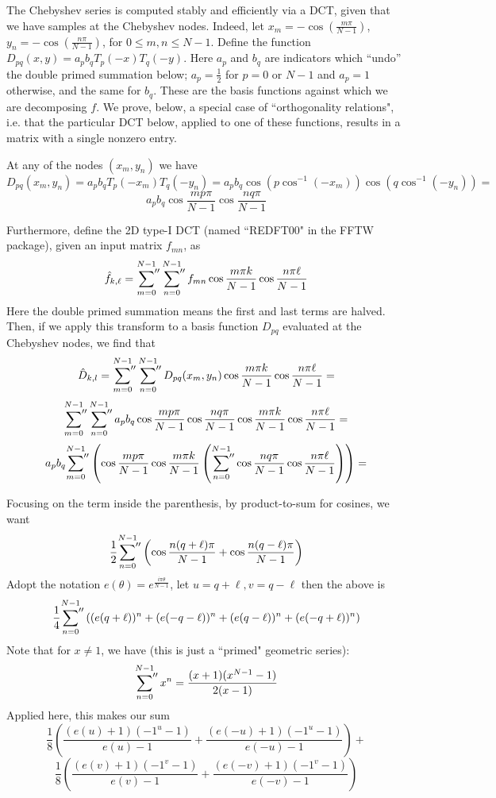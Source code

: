 The Chebyshev series is computed stably and efficiently via a DCT, given that we have samples at the Chebyshev nodes.  Indeed, let  $x_m = -\cos( \frac{m \pi}{N-1})$, $y_n = -\cos( \frac{n \pi}{N-1})$, for $0 \leq m,n \leq N-1$.   Define the function $D_{pq}(x,y) = a_p b_q T_p(-x) T_q(-y)$. Here $a_p$ and $b_q$ are indicators which ``undo'' the double primed summation below; $a_p=\frac{1}{2}$ for $p=0$ or $N-1$ and $a_p=1$ otherwise, and the same for $b_q$.  These are the basis functions against which we are decomposing $f$.  We prove, below, a special case of ``orthogonality relations", i.e. that the particular DCT below, applied to one of these functions, results in a matrix with a single nonzero entry.

At any of the nodes $(x_m,y_n)$ we have
\[  D_{pq}(x_m,y_n) = a_p b_qT_p(-x_m)T_q(-y_n) = a_p b_q\cos (p \cos^{-1}(-x_m))  \cos (q \cos^{-1}(-y_n)) = \]
\[a_p b_q \cos \frac{m p \pi}{N-1} \cos \frac{n q \pi}{N-1}  \] 

Furthermore, define the 2D type-I DCT (named ``REDFT00" in the FFTW package), given an input matrix $f_{mn}$, as 
\[ \hat{f}_{k,\ell} = \sideset{}{''}\sum_{m=0}^{N-1} \sideset{}{''}\sum_{n=0}^{N-1}f_{mn} \cos \frac{m \pi k}{N-1} \cos \frac{n \pi \ell}{N-1} \]
Here the double primed summation means the first and last terms are halved.
Then, if we apply this transform to a basis function $D_{pq}$ evaluated at the Chebyshev nodes, we find that
\[ \hat{D}_{k,l} = \sideset{}{''}\sum_{m=0}^{N-1} \sideset{}{''}\sum_{n=0}^{N-1} D_{pq}(x_m,y_n) \cos \frac{m \pi k}{N-1} \cos \frac{n \pi \ell}{N-1} =  \]
\[ \sideset{}{''}\sum_{m=0}^{N-1} \sideset{}{''}\sum_{n=0}^{N-1} a_p b_q \cos \frac{m p \pi}{N-1} \cos \frac{n q \pi}{N-1} \cos \frac{m \pi k}{N-1} \cos \frac{n \pi \ell}{N-1}  =  \]
\[ a_p b_q \sideset{}{''} \sum_{m=0}^{N-1}  \left( \cos \frac{m p \pi}{N-1} \cos \frac{m \pi k}{N-1} \left( \sideset{}{''} \sum_{n=0}^{N-1} \cos \frac{n q \pi}{N-1}  \cos \frac{n \pi \ell}{N-1}  \right) \right)= \]


Focusing on the term inside the parenthesis, by product-to-sum for cosines, we want
\[ \frac{1}{2}  \sideset{}{''} \sum_{n=0}^{N-1} \left( \cos \frac{n (q+\ell) \pi}{N-1} + \cos \frac{n (q - \ell) \pi }{N-1} \right)  \]
Adopt the notation $e(\theta) = e^{\frac{i \pi \theta}{N-1}}$, let $u=q+\ell, v = q-\ell$  then the above is
\[ \frac{1}{4} \sideset{}{''}  \sum_{n=0}^{N-1} \left( (e(q+\ell))^n +  (e(-q-\ell))^n + (e(q-\ell))^n +  (e(-q+\ell))^n \right)\] 
Note that for $x\neq1$, we have (this is just a ``primed" geometric series):
\[ \sideset{}{''}  \sum_{n=0}^{N-1} x^n = \frac{(x+1)(x^{N-1} - 1)}{2(x-1)} \]
Applied here, this makes our sum 
\[ \frac{1}{8}\left( 
\frac{(e(u) + 1)(-1^u-1)}{e(u) - 1}+
\frac{(e(-u) + 1)(-1^u-1)}{e(-u) - 1} \right)+\]\[
\frac{1}{8}\left(
\frac{(e(v) + 1)(-1^v-1)}{e(v) - 1}+
\frac{(e(-v) + 1)(-1^v-1)}{e(-v) - 1}
  \right)
\] 

